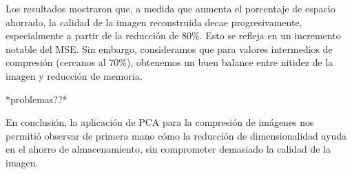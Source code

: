 \documentclass[a4paper,12pt]{article}
\begin{document}
Los resultados mostraron que, a medida que aumenta el porcentaje de espacio ahorrado, la calidad
de la imagen reconstruida decae progresivamente, especialmente a partir de la reducción de 80\%. 
Esto se refleja en un incremento notable del MSE. Sin embargo, consideramos que
para valores intermedios de compresión (cercanos al 70\%), obtenemos un buen balance entre nitidez 
de la imagen y reducción de memoria. 

\vspace{1em}

*problemas??*

\vspace{1em}

En conclusión, la aplicación de PCA para la compresión de imágenes nos permitió observar
de primera mano cómo la reducción de dimensionalidad ayuda en el ahorro de almacenamiento,
sin comprometer demasiado la calidad de la imagen.
\end{document}
